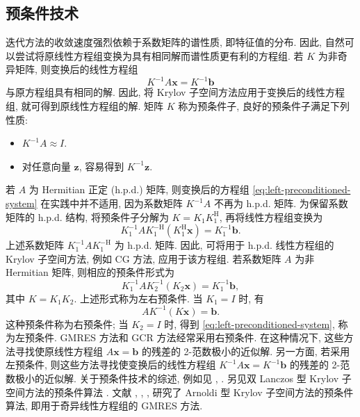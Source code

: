 \subsection{{预条件技术}}\label{sec:preconditioning-techniques}
{迭代方法的收敛速度强烈依赖于系数矩阵的谱性质, 即特征值的分布. 因此, 自然可以尝试将原线性方程组变换为具有相同解而谱性质更有利的方程组. 若 $K$ 为非奇异矩阵, 则变换后的线性方程组}
\begin{equation}\label{eq:left-preconditioned-system}K^{-1}A\bm x=K^{-1}\bm b\end{equation}
{与原方程组具有相同的解. 因此, 将 Krylov 子空间方法应用于变换后的线性方程组, 就可得到原线性方程组的解. 矩阵 $K$ 称为预条件子, 良好的预条件子满足下列性质:}
\begin{itemize}\item $K^{-1}A\approx I$.
\item {对任意向量 $\bm z$, 容易得到 $K^{-1}\bm z$.}\end{itemize}
{若 $A$ 为 Hermitian 正定 (h.p.d.) 矩阵, 则变换后的方程组 \eqref{eq:left-preconditioned-system} 在实践中并不适用, 因为系数矩阵 $K^{-1}A$ 不再为 h.p.d. 矩阵. 为保留系数矩阵的 h.p.d. 结构, 将预条件子分解为 $K=K_1K_1^{\mathrm H}$, 再将线性方程组变换为}
\[K_1^{-1}AK_1^{-\mathrm H}(K_1^{\mathrm H}\bm x)=K_1^{-1}\bm b.\]
{上述系数矩阵 $K_1^{-1}AK_1^{-\mathrm H}$ 为 h.p.d. 矩阵. 因此, 可将用于 h.p.d. 线性方程组的 Krylov 子空间方法, 例如 CG 方法, 应用于该方程组. 若系数矩阵 $A$ 为非 Hermitian 矩阵, 则相应的预条件形式为}
\begin{equation}\label{eq:split-preconditioned-system}K_1^{-1}AK_2^{-1}(K_2\bm x)=K_1^{-1}\bm b,\end{equation}
{其中 $K=K_1K_2$. 上述形式称为左右预条件. 当 $K_1=I$ 时, 有}
\begin{equation}\label{eq:right-preconditioned-system}AK^{-1}(K\bm x)=\bm b.\end{equation}
{这种预条件称为右预条件; 当 $K_2=I$ 时, 得到 \eqref{eq:left-preconditioned-system}, 称为左预条件.}
{GMRES 方法和 GCR 方法经常采用右预条件. 在这种情况下, 这些方法寻找使原线性方程组 $A\bm x=\bm b$ 的残差的 2-范数极小的近似解. 另一方面, 若采用左预条件, 则这些方法寻找使变换后的线性方程组 $K^{-1}A\bm x=K^{-1}\bm b$ 的残差的 2-范数极小的近似解.}
{关于预条件技术的综述, 例如见 , . 另见双 Lanczos 型 Krylov 子空间方法的预条件算法 . 文献 , , ,  研究了 Arnoldi 型 Krylov 子空间方法的预条件算法, 即用于奇异线性方程组的 GMRES 方法.}
